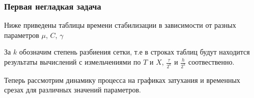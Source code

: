 \subsubsection{Первая негладкая задача}
Ниже приведены таблицы времени стабилизации в зависимости от разных параметров $\mu$, $C$, $\gamma$

За $k$ обозначим степень разбиения сетки, т.е в строках таблиц будут находится результаты вычислений с измельчениями по $T$ и $X$, $\frac{\tau}{2^k}$ и $\frac{h}{2^k}$ соотвественно.

\newpage




\newpage




\newpage
Теперь рассмотрим динамику процесса на графиках затухания и временных срезах для различных значений параметров. 

